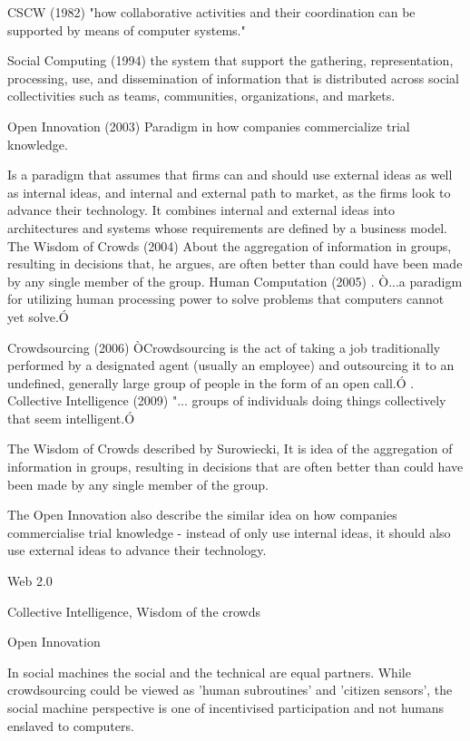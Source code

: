 \documentclass{sig-alternate}
\begin{document}
CSCW (1982)	"how collaborative activities and their coordination can be supported by means of computer systems."

Social Computing (1994)	the system that support the gathering, representation, processing, use, and dissemination of information that is distributed across social collectivities such as teams, communities, organizations, and markets. 
	
	
Open Innovation (2003)	Paradigm in how companies commercialize trial knowledge.  

Is a paradigm that assumes that firms can and should use external ideas as well as internal ideas, and internal and external path to market, as the firms look to advance their technology. It combines internal and external ideas into architectures and systems whose requirements are defined by a business model. 
The Wisdom of Crowds (2004)
	About the aggregation of information in groups, resulting in decisions that, he argues, are often better than could have been made by any single member of the group. 
Human Computation (2005)	.	Ò...a paradigm for utilizing human processing power to solve problems that computers cannot yet solve.Ó 

Crowdsourcing (2006)	ÒCrowdsourcing is the act of taking a job traditionally
performed by a designated agent (usually an employee) and outsourcing it to an undefined, generally large group of people in the form of an open call.Ó
.	
Collective Intelligence (2009)	"... groups of individuals doing things collectively that seem intelligent.Ó

The Wisdom of Crowds described by Surowiecki, It is idea of the aggregation of information in groups, resulting in decisions that are often better than could have been made by any single member of the group. 

The Open Innovation also describe the similar idea on how companies commercialise trial knowledge - instead of only use internal ideas, it should also use external ideas to advance their technology.     


Web 2.0

Collective Intelligence, Wisdom of the crowds

Open Innovation

In  social machines  the  social and  the  technical are equal  partners. While  crowdsourcing  could  be  viewed  as  'human  subroutines'  and  'citizen  sensors',  the
social machine perspective is one of incentivised participation and not humans enslaved to computers.
\end{document}
